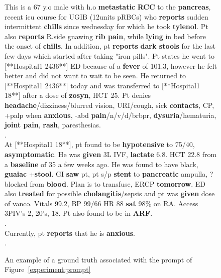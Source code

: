 \begin{figure}[h]
    \centering
    \begin{tcolorbox}[colback=green!5!white,colframe=green!75!black]
    This is a 67 y.o male with h.o \textbf{metastatic} \textbf{RCC} to the \textbf{pancreas},
recent \gls{icu} course for UGIB (12units pRBCs) who \textbf{reports} sudden
intermittent \textbf{chills} since wednesday for which he took \textbf{tylenol}.
Pt also \textbf{reports} R.side gnawing \textbf{rib pain}, while \textbf{lying} in bed
before the onset of \textbf{chills}. In addition, pt \textbf{reports} \textbf{dark stools}
for the last few days which started after taking "iron pills".
Pt states he went to [**Hospital1 2436**] ED because of a \textbf{fever} of 101.3,
however he felt better and did not want to wait to be seen. He
returned to [**Hospital1 2436**] today and was transferred to [**Hospital1 18**] after
a dose of \textbf{zosyn}, HCT 25. Pt denies \textbf{headache}/dizziness/blurred
vision, URI/cough, sick \textbf{contacts}, CP, +palp when \textbf{anxious}, -abd
\textbf{pain}/n/v/d/brbpr, \textbf{dysuria}/hematuria, \textbf{joint pain}, \textbf{rash},
paresthesias. \\
. \\
At [**Hospital1 18**], pt found to be \textbf{hypotensive} to 75/40, \textbf{asymptomatic}. He
was \textbf{given} 3L IVF, \textbf{lactate} 6.8. HCT 22.8 from a \textbf{baseline} of 35 a
few weeks ago. He was found to have black, \textbf{guaiac} +\textbf{stool}. GI \textbf{saw}
pt, pt s/p \textbf{stent} to \textbf{pancreatic} ampulla, ?blocked  from \textbf{blood}.
Plan is to transfuse, ERCP \textbf{tomorrow}. ED also \textbf{treated} for
possible \textbf{cholangitis}/sepsis and pt was \textbf{given} dose of vanco.
Vitals 99.2, BP 99/66 HR 88 \textbf{sat} 98\% on RA. Access 3PIV's 2,
20's, 18. Pt also found to be in \textbf{ARF}. \\
. \\
Currently, pt \textbf{reports} that he is \textbf{anxious}. \\
.
    \end{tcolorbox}
    \caption{An example of a ground truth associated with the prompt of Figure~\ref{experiment:prompt}}
    \label{fig:ground-truth}
\end{figure}

